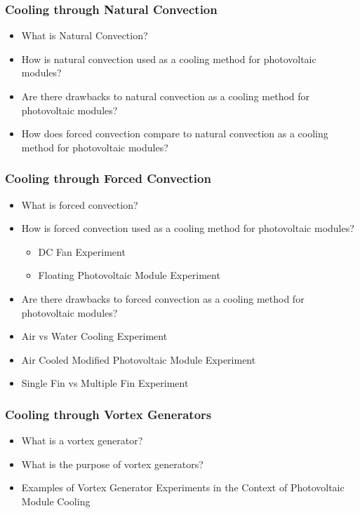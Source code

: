 \subsubsection{Cooling through Natural Convection}
\begin{itemize}
    \item What is Natural Convection?
    \item How is natural convection used as a cooling method for photovoltaic modules?
    \item Are there drawbacks to natural convection as a cooling method for photovoltaic modules?
    \item How does forced convection compare to natural convection as a cooling method for photovoltaic modules?
\end{itemize}

\subsubsection{Cooling through Forced Convection}
\begin{itemize}
    \item What is forced convection?
    \item How is forced convection used as a cooling method for photovoltaic modules?
    \begin{itemize}
        \item DC Fan Experiment
        \item Floating Photovoltaic Module Experiment
    \end{itemize}
    \item Are there drawbacks to forced convection as a cooling method for photovoltaic modules?
    \item Air vs Water Cooling Experiment
    \item Air Cooled Modified Photovoltaic Module Experiment
    \item Single Fin vs Multiple Fin Experiment
\end{itemize}

\subsubsection{Cooling through Vortex Generators}
\begin{itemize}
    \item What is a vortex generator?
    \item What is the purpose of vortex generators?
    \item Examples of Vortex Generator Experiments in the Context of Photovoltaic Module Cooling
\end{itemize}